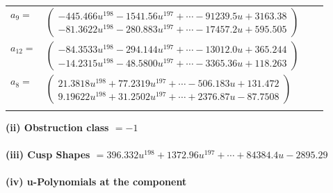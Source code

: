 \documentclass[1p]{elsarticle_modified}
\theoremstyle{definition}
\begin{document}
\begin{tabular}{m{7pt} m{180pt} m{7pt} m{180pt} }
\flushright $a_{9}=$&$\begin{pmatrix}-445.466 u^{198}-1541.56 u^{197}+\cdots-91239.5 u+3163.38\\-81.3622 u^{198}-280.883 u^{197}+\cdots-17457.2 u+595.505\end{pmatrix}$ \\
\flushright $a_{12}=$&$\begin{pmatrix}-84.3533 u^{198}-294.144 u^{197}+\cdots-13012.0 u+365.244\\-14.2315 u^{198}-48.5800 u^{197}+\cdots-3365.36 u+118.263\end{pmatrix}$ \\
\flushright $a_{8}=$&$\begin{pmatrix}21.3818 u^{198}+77.2319 u^{197}+\cdots-506.183 u+131.472\\9.19622 u^{198}+31.2502 u^{197}+\cdots+2376.87 u-87.7508\end{pmatrix}$\\&\end{tabular}
\flushleft \textbf{(ii) Obstruction class $= -1$}\\~\\
\flushleft \textbf{(iii) Cusp Shapes $= 396.332 u^{198}+1372.96 u^{197}+\cdots+84384.4 u-2895.29$}\\~\\
\newpage\renewcommand{\arraystretch}{1}
\flushleft \textbf{(iv) u-Polynomials at the component}\newline \\
\end{document}
